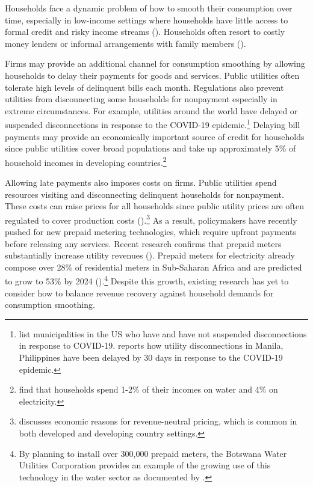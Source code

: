 \documentclass[12pt,table]{article}
\begin{document}
Households face a dynamic problem of how to smooth their consumption over time, especially in low-income settings where households have little access to formal credit and risky income streams (\cite{morduch1995income}).  Households often resort to costly money lenders or informal arrangements with family members (\cite{banerjee2007economic}).  

Firms may provide an additional channel for consumption smoothing by allowing households to delay their payments for goods and services.  Public utilities often tolerate high levels of delinquent bills each month.  Regulations also prevent utilities from disconnecting some households for nonpayment especially in extreme circumstances.  For example, utilities around the world have delayed or suspended disconnections in response to the COVID-19 epidemic.\footnote{\cite{bufordcampbell2020} list municipalities in the US who have and have not suspended disconnections in response to COVID-19.  \cite{domingo2020} reports how utility disconnections in Manila, Philippines have been delayed by 30 days in response to the COVID-19 epidemic.}   Delaying bill payments may provide an economically important source of credit for households since public utilities cover broad populations and take up approximately 5\% of household incomes in developing countries.\footnote{\cite{komives2006distributional} find that households spend 1-2\% of their incomes on water and 4\% on electricity.}

Allowing late payments also imposes costs on firms.  Public utilities spend resources visiting and disconnecting delinquent households for nonpayment.  These costs can raise prices for all households since public utility prices are often regulated to cover production costs (\cite{hoque2013state}).\footnote{\cite{laffont2005regulation} discusses economic reasons for revenue-neutral pricing, which is common in both developed and developing country settings.}  As a result, policymakers have recently pushed for new prepaid metering technologies, which require upfront payments before releasing any services.  Recent research confirms that prepaid meters substantially increase utility revenues (\cite{jack2016charging}).  Prepaid meters for electricity already compose over 28\% of residential meters in Sub-Saharan Africa and are predicted to grow to 53\% by 2024 (\cite{northeast2014}).\footnote{By planning to install over 300,000 prepaid meters, the Botswana Water Utilities Corporation provides an example of the growing use of this technology in the water sector as documented by \cite{heymans2014limits}.}  Despite this growth, existing research has yet to consider how to balance revenue recovery against household demands for consumption smoothing.
\end{document}
